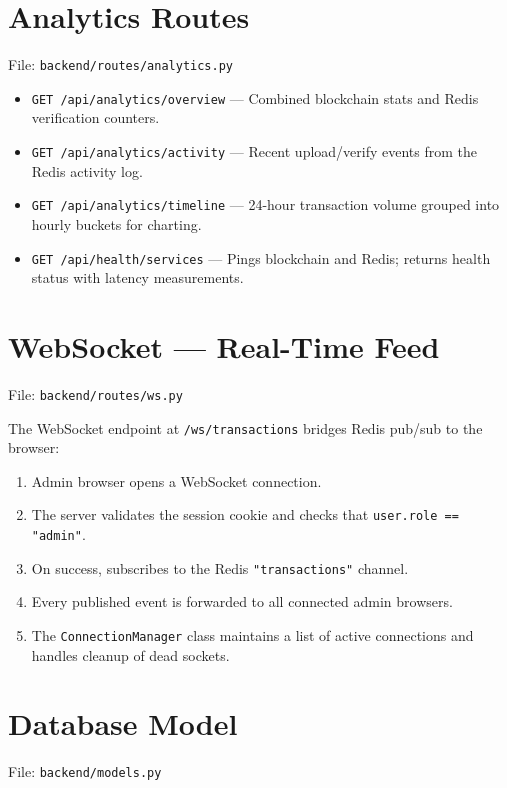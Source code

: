\documentclass[12pt, a4paper]{report}
\begin{document}
\section{Analytics Routes}

File: \texttt{backend/routes/analytics.py}

\begin{itemize}
    \item \texttt{GET /api/analytics/overview} — Combined blockchain stats and
          Redis verification counters.
    \item \texttt{GET /api/analytics/activity} — Recent upload/verify events
          from the Redis activity log.
    \item \texttt{GET /api/analytics/timeline} — 24-hour transaction volume
          grouped into hourly buckets for charting.
    \item \texttt{GET /api/health/services} — Pings blockchain and Redis;
          returns health status with latency measurements.
\end{itemize}

\section{WebSocket — Real-Time Feed}

File: \texttt{backend/routes/ws.py}

The WebSocket endpoint at \texttt{/ws/transactions} bridges Redis pub/sub to
the browser:

\begin{enumerate}
    \item Admin browser opens a WebSocket connection.
    \item The server validates the session cookie and checks that
          \texttt{user.role == "admin"}.
    \item On success, subscribes to the Redis \texttt{"transactions"} channel.
    \item Every published event is forwarded to all connected admin browsers.
    \item The \texttt{ConnectionManager} class maintains a list of active
          connections and handles cleanup of dead sockets.
\end{enumerate}

\section{Database Model}

File: \texttt{backend/models.py}
\end{document}

